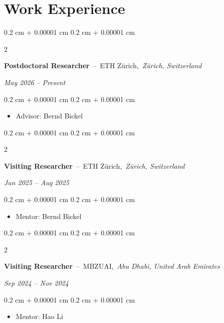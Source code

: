 \documentclass[10pt, letterpaper]{article}
\newenvironment{highlights}{
    \begin{itemize}[
        topsep=0.10 cm,
        parsep=0.10 cm,
        partopsep=0pt,
        itemsep=0pt,
        leftmargin=0.4 cm + 10pt
    ]
}{
    \end{itemize}
} %
\newenvironment{onecolentry}{
    \begin{adjustwidth}{
        0.2 cm + 0.00001 cm
    }{
        0.2 cm + 0.00001 cm
    }
}{
    \end{adjustwidth}
} %
\newenvironment{twocolentry}[2][]{
    \onecolentry
    \def\secondColumn{#2}
    \setcolumnwidth{\fill, 4.5 cm}
    \begin{paracol}{2}
}{
    \switchcolumn \raggedleft \secondColumn
    \end{paracol}
    \endonecolentry
} %
\begin{document}
    \section{Work Experience}
        \begin{twocolentry}{
        \textit{May 2026 -- Present}}
            \textbf{Postdoctoral Researcher}
            \,--\,
            ETH Z\"urich,\,
            \textit{Z\"urich, Switzerland}
        \end{twocolentry}
        \vspace{0.10 cm}
        \begin{onecolentry}
            \begin{highlights}
                \item Advisor: Bernd Bickel
            \end{highlights}
        \end{onecolentry}

        \vspace{0.2 cm}
        \begin{twocolentry}{
        \textit{Jun 2025 -- Aug 2025}}
            \textbf{Visiting Researcher}
            \,--\,
            ETH Z\"urich,\,
            \textit{Z\"urich, Switzerland}
        \end{twocolentry}
        \vspace{0.10 cm}
        \begin{onecolentry}
            \begin{highlights}
                \item Mentor: Bernd Bickel
            \end{highlights}
        \end{onecolentry}

        \vspace{0.2 cm}
        \begin{twocolentry}{
        \textit{Sep 2024 -- Nov 2024}}
            \textbf{Visiting Researcher}
            \,--\,
            MBZUAI,\,
            \textit{Abu Dhabi, United Arab Emirates}
        \end{twocolentry}
        \vspace{0.10 cm}
        \begin{onecolentry}
            \begin{highlights}
                \item Mentor: Hao Li
            \end{highlights}
        \end{onecolentry}
\end{document}
